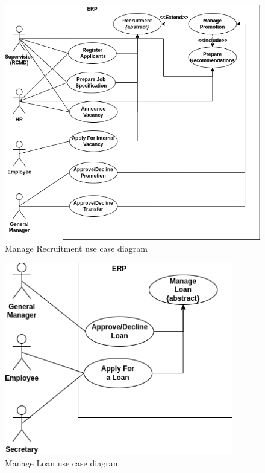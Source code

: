 \begin{figure}[!ht]
\centering
\includegraphics[width=15cm,keepaspectratio]{usecases/recruitment.drawio.png}
\caption{Manage Recruitment use case diagram }
\end{figure}


\begin{figure}[!ht]
\centering
\includegraphics[width=10cm,keepaspectratio]{usecases/loan.drawio.png}
\caption{Manage Loan use case diagram }
\end{figure}

